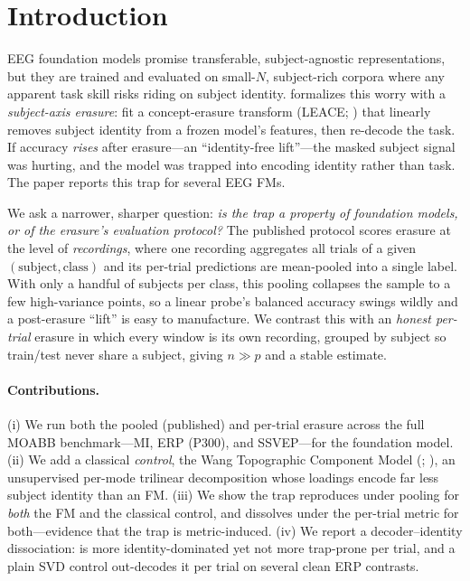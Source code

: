 \documentclass[11pt]{article}
\begin{document}
\section{Introduction}
EEG foundation models promise transferable, subject-agnostic representations, but they are trained
and evaluated on small-$N$, subject-rich corpora where any apparent task skill risks riding on
subject identity. \fmscope{} \citep{fmscope} formalizes this worry with a \emph{subject-axis
erasure}: fit a concept-erasure transform (LEACE; \citealp{belrose2023leace}) that linearly removes
subject identity from a frozen model's features, then re-decode the task. If accuracy \emph{rises}
after erasure---an ``identity-free lift''---the masked subject signal was hurting, and the model was
trapped into encoding identity rather than task. The paper reports this trap for several EEG FMs.

We ask a narrower, sharper question: \emph{is the trap a property of foundation models, or of the
erasure's evaluation protocol?} The published protocol scores erasure at the level of
\emph{recordings}, where one recording aggregates all trials of a given $(\text{subject},
\text{class})$ and its per-trial predictions are mean-pooled into a single label. With only a
handful of subjects per class, this pooling collapses the sample to a few high-variance points, so
a linear probe's balanced accuracy swings wildly and a post-erasure ``lift'' is easy to manufacture.
We contrast this with an \emph{honest per-trial} erasure in which every window is its own recording,
grouped by subject so train/test never share a subject, giving $n\gg p$ and a stable estimate.

\paragraph{Contributions.}
(i) We run both the pooled (published) and per-trial erasure across the full MOABB
\citep{jayaram2018moabb} benchmark---MI, ERP (P300), and SSVEP---for the \reve{} foundation model.
(ii) We add a classical \emph{control}, the Wang Topographic Component Model (\tcm{};
\citealp{wang2000tcm}), an unsupervised per-mode trilinear decomposition whose loadings encode far
less subject identity than an FM. (iii) We show the trap reproduces under pooling for \emph{both}
the FM and the classical control, and dissolves under the per-trial metric for both---evidence that
the trap is metric-induced. (iv) We report a decoder--identity dissociation: \reve{} is more
identity-dominated yet not more trap-prone per trial, and a plain SVD control out-decodes it per
trial on several clean ERP contrasts.
\end{document}
